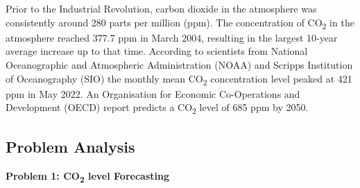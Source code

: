 \documentclass{mcmthesis}
\begin{document}
    Prior to the Industrial Revolution, carbon dioxide in the atmosphere was consistently around 280 parts per million (ppm).
    The concentration of CO\textsubscript{2} in the atmosphere reached 377.7 ppm in March 2004, resulting in the largest 10-year average increase up to that time.
    According to scientists from National Oceanographic and Atmospheric Administration (NOAA) and Scripps Institution of Oceanography (SIO) the monthly mean CO\textsubscript{2} concentration level peaked at 421 ppm in May 2022.
    An Organisation for Economic Co-Operations and Development (OECD) report predicts a CO\textsubscript{2} level of 685 ppm by 2050.

    \subsection{Problem Analysis}
    \noindent\textbf{Problem 1: CO\textsubscript{2} level Forecasting}
\end{document}
